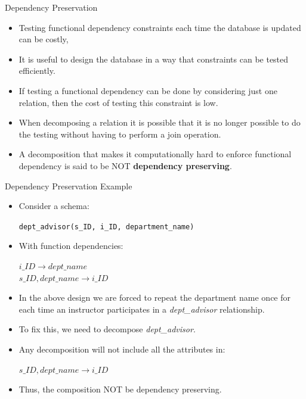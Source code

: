 \documentclass[aspectratio=169]{beamer}
\begin{document}
\begin{frame}{Dependency Preservation}
    \begin{itemize}
        \item Testing functional dependency constraints each time the database is updated can be costly,
        \item It is useful to design the database in a way that constraints can be tested efficiently.
        \item If testing a functional dependency can be done by considering just one relation, then the cost of testing this constraint is low.
        \item When decomposing a relation it is possible that it is no longer possible to do the testing without having to perform a join operation.
        \item A decomposition that makes it computationally hard to enforce functional dependency is said to be NOT \textbf{dependency preserving}.
    \end{itemize}
\end{frame}

\begin{frame}{Dependency Preservation Example}
    \begin{itemize}
        \item Consider a schema:
            \begin{center}
                \texttt{dept\_advisor(s\_ID, i\_ID, department\_name)}
            \end{center}
        \item With function dependencies:
            \begin{center}
                $i\_ID \rightarrow dept\_name$ \\
                $s\_ID, dept\_name \rightarrow i\_ID$
            \end{center}
        \item In the above design we are forced to repeat the department name once for each time an instructor participates in a \textit{dept\_advisor} relationship.
        \item To fix this, we need to decompose \textit{dept\_advisor}.
        \item Any decomposition will not include all the attributes in:
            \begin{center}
                $s\_ID, dept\_name \rightarrow i\_ID$
            \end{center}
        \item Thus, the composition NOT be dependency preserving.
    \end{itemize}
\end{frame}
\end{document}
